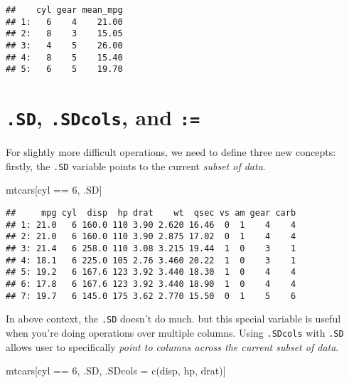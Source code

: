 \documentclass[
]{book}
\newenvironment{Shaded}{\begin{snugshade}}{\end{snugshade}}
\newcommand{\DecValTok}[1]{\textcolor[rgb]{0.00,0.00,0.81}{#1}}
\newcommand{\FunctionTok}[1]{\textcolor[rgb]{0.00,0.00,0.00}{#1}}
\newcommand{\NormalTok}[1]{#1}
\newcommand{\OtherTok}[1]{\textcolor[rgb]{0.56,0.35,0.01}{#1}}
\newcommand{\SpecialCharTok}[1]{\textcolor[rgb]{0.00,0.00,0.00}{#1}}
\newcommand{\StringTok}[1]{\textcolor[rgb]{0.31,0.60,0.02}{#1}}
\begin{document}
\begin{verbatim}
##    cyl gear mean_mpg
## 1:   6    4    21.00
## 2:   8    3    15.05
## 3:   4    5    26.00
## 4:   8    5    15.40
## 5:   6    5    19.70
\end{verbatim}

\hypertarget{sd-.sdcols-and}{%
\section{\texorpdfstring{\texttt{.SD}, \texttt{.SDcols}, and \texttt{:=}}{.SD, .SDcols, and :=}}\label{sd-.sdcols-and}}

For slightly more difficult operations, we need to define three new concepts: firstly, the \texttt{.SD} variable points to the current \emph{subset of data}.

\begin{Shaded}
\begin{Highlighting}[]
\NormalTok{mtcars[cyl }\SpecialCharTok{==} \DecValTok{6}\NormalTok{, .SD]}
\end{Highlighting}
\end{Shaded}

\begin{verbatim}
##     mpg cyl  disp  hp drat    wt  qsec vs am gear carb
## 1: 21.0   6 160.0 110 3.90 2.620 16.46  0  1    4    4
## 2: 21.0   6 160.0 110 3.90 2.875 17.02  0  1    4    4
## 3: 21.4   6 258.0 110 3.08 3.215 19.44  1  0    3    1
## 4: 18.1   6 225.0 105 2.76 3.460 20.22  1  0    3    1
## 5: 19.2   6 167.6 123 3.92 3.440 18.30  1  0    4    4
## 6: 17.8   6 167.6 123 3.92 3.440 18.90  1  0    4    4
## 7: 19.7   6 145.0 175 3.62 2.770 15.50  0  1    5    6
\end{verbatim}

In above context, the \texttt{.SD} doesn't do much. but this special variable is useful when you're doing operations over multiple columns. Using \texttt{.SDcols} with \texttt{.SD} allows user to specifically \emph{point to columns across the current subset of data}.

\begin{Shaded}
\begin{Highlighting}[]
\NormalTok{mtcars[cyl }\SpecialCharTok{==} \DecValTok{6}\NormalTok{, .SD, .SDcols }\OtherTok{=} \FunctionTok{c}\NormalTok{(}\StringTok{\textquotesingle{}disp\textquotesingle{}}\NormalTok{, }\StringTok{\textquotesingle{}hp\textquotesingle{}}\NormalTok{, }\StringTok{\textquotesingle{}drat\textquotesingle{}}\NormalTok{)]}
\end{Highlighting}
\end{Shaded}
\end{document}
